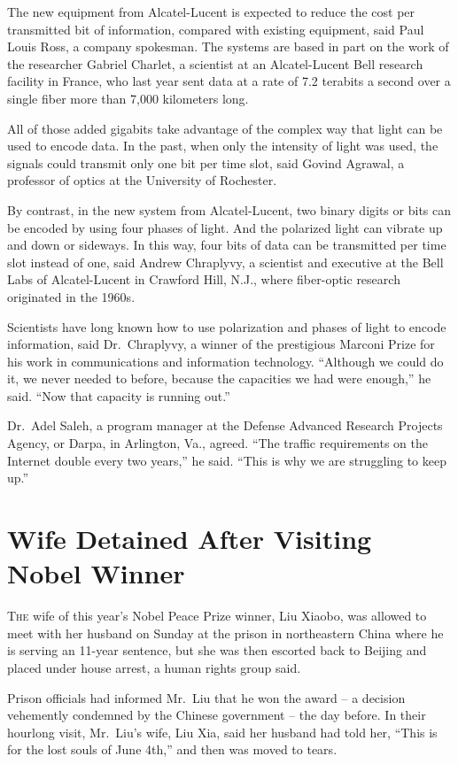 ﻿\documentclass[12pt]{article}
\begin{document}
The new equipment from Alcatel-Lucent is expected to reduce the cost per transmitted bit of
information, compared with existing equipment, said Paul Louis Ross, a company spokesman. The
systems are based in part on the work of the researcher Gabriel Charlet, a scientist at an
Alcatel-Lucent Bell research facility in France, who last year sent data at a rate of 7.2 terabits a
second over a single fiber more than 7,000 kilometers long.

All of those added gigabits take advantage of the complex way that light can be used to encode data.
In the past, when only the intensity of light was used, the signals could transmit only one bit per
time slot, said Govind Agrawal, a professor of optics at the University of Rochester.

By contrast, in the new system from Alcatel-Lucent, two binary digits or bits can be encoded by
using four phases of light. And the polarized light can vibrate up and down or sideways. In this
way, four bits of data can be transmitted per time slot instead of one, said Andrew Chraplyvy, a
scientist and executive at the Bell Labs of Alcatel-Lucent in Crawford Hill, N.J., where fiber-optic
research originated in the 1960s.

Scientists have long known how to use polarization and phases of light to encode information, said
Dr.~Chraplyvy, a winner of the prestigious Marconi Prize for his work in communications and
information technology. ``Although we could do it, we never needed to before, because the capacities
we had were enough,'' he said. ``Now that capacity is running out.''

Dr.~Adel Saleh, a program manager at the Defense Advanced Research Projects Agency, or Darpa, in
Arlington, Va., agreed. ``The traffic requirements on the Internet double every two years,'' he
said. ``This is why we are struggling to keep up.''

\section{Wife Detained After Visiting Nobel Winner}

\lettrine{T}{he} wife of this year's Nobel Peace Prize winner, Liu Xiaobo,
was allowed to meet with her husband on Sunday at the prison in northeastern China where he is
serving an 11-year sentence, but she was then escorted back to Beijing and placed under house
arrest, a human rights group said.

Prison officials had informed Mr.~Liu that he won the award -- a decision vehemently condemned by
the Chinese government -- the day before. In their hourlong visit, Mr.~Liu's wife, Liu Xia, said her
husband had told her, ``This is for the lost souls of June 4th,'' and then was moved to tears.
\end{document}
